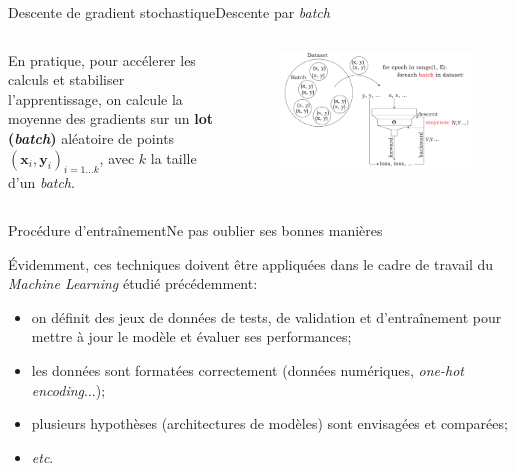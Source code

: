 \documentclass[12pt,dvipsnames,aspectratio=169]{beamer}
\newcommand{\x}[0]{\mathbf{x}}
\newcommand{\y}[0]{\mathbf{y}}
\begin{document}
\begin{frame}{Descente de gradient stochastique}{Descente par \textit{batch}}

\begin{columns}

    En pratique, pour accélerer les calculs et stabiliser l'apprentissage, on calcule la moyenne des gradients sur un \textbf{lot (\textit{batch})} aléatoire de points $(\x_i, \y_i)_{i=1\dots k}$, avec $k$ la taille d'un \textit{batch}.


    \begin{figure}
        \centering
        \includegraphics[width=\textwidth]{figures/sgd_batch.pdf}
    \end{figure}

\end{columns}
    
\end{frame}

\begin{frame}{Procédure d'entraînement}{Ne pas oublier ses bonnes manières}

Évidemment, ces techniques doivent être appliquées dans le cadre de travail du \textit{Machine Learning} étudié précédemment:

\begin{itemize}
    \item on définit des jeux de données de tests, de validation et d'entraînement pour mettre à jour le modèle et évaluer ses performances;
    \item les données sont formatées correctement (données numériques, \textit{one-hot encoding}...);
    \item plusieurs hypothèses (architectures de modèles) sont envisagées et comparées;
    \item \textit{etc}.
\end{itemize}
    
\end{frame}
\end{document}
